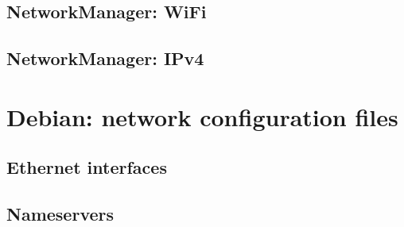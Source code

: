 \documentclass[a4paper,12pt,twoside,openright,titlepage]{book}
\begin{document}
\subsection{NetworkManager: WiFi}

\subsection{NetworkManager: IPv4}


\section{Debian: network configuration files}

\subsection{Ethernet interfaces}

\subsection{Nameservers}


\printindex
\end{document}

